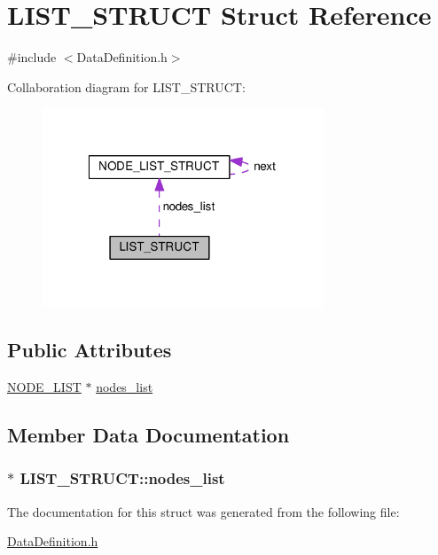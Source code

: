 \hypertarget{structLIST__STRUCT}{\section{L\-I\-S\-T\-\_\-\-S\-T\-R\-U\-C\-T Struct Reference}
\label{structLIST__STRUCT}
}


{\ttfamily \#include $<$Data\-Definition.\-h$>$}



Collaboration diagram for L\-I\-S\-T\-\_\-\-S\-T\-R\-U\-C\-T\-:
\nopagebreak
\begin{figure}[H]
\begin{center}
\leavevmode
\includegraphics[width=238pt]{structLIST__STRUCT__coll__graph}
\end{center}
\end{figure}
\subsection*{Public Attributes}
\begin{DoxyCompactItemize}
\item 
\hyperlink{DataDefinition_8h_a8804182fdd4652d904801ac03e3d9307}{N\-O\-D\-E\-\_\-\-L\-I\-S\-T} $\ast$ \hyperlink{structLIST__STRUCT_a480f01d85e0c69f63eeeb62c4378e19e}{nodes\-\_\-list}
\end{DoxyCompactItemize}


\subsection{Member Data Documentation}
\hypertarget{structLIST__STRUCT_a480f01d85e0c69f63eeeb62c4378e19e}{
\subsubsection[{nodes\-\_\-list}]{$\ast$ L\-I\-S\-T\-\_\-\-S\-T\-R\-U\-C\-T\-::nodes\-\_\-list}}\label{structLIST__STRUCT_a480f01d85e0c69f63eeeb62c4378e19e}


The documentation for this struct was generated from the following file\-:\begin{DoxyCompactItemize}
\item 
\hyperlink{DataDefinition_8h}{Data\-Definition.\-h}\end{DoxyCompactItemize}
